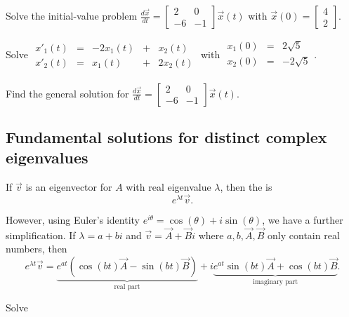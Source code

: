 \documentclass[../main.tex]{subfiles}
\begin{document}
\begin{example}
  Solve the initial-value problem \( \frac{d\vec{x}}{dt} = \begin{bmatrix} 2   & 0  \\ -6 & -1 \end{bmatrix} \vec{x}(t) \) with \(\vec{x}(0) = \begin{bmatrix} 4 \\ 2 \end{bmatrix}\).

\end{example}
\clearpage
\clearpage

\begin{example}
  Solve 
  \(
    \begin{array}{rcrcr}
      x'_{1}(t) &=& -2 x_{1}(t) &+&  x_{2}(t) \\
      x'_{2}(t) &=&    x_{1}(t) &+& 2x_{2}(t)
    \end{array}
  \) with \(
    \begin{array}{rcr}
      x_{1}(0) &=&  2 \sqrt{5} \\
      x_{2}(0) &=& -2 \sqrt{5} \\
    \end{array}
  \).
\end{example}
\clearpage

\begin{example}
  Find the general solution for \( \frac{d\vec{x}}{dt} = \begin{bmatrix} 2   & 0  \\ -6 & -1 \end{bmatrix} \vec{x}(t) \).
\end{example}

\subsection{Fundamental solutions for distinct complex eigenvalues} \label{sec:DE-homogeneous-linear-distinct-complex-eigenvalues}

\begin{definition}
  If \(\vec{v}\) is an eigenvector for \(A\) with real eigenvalue \(\lambda\), then the  is 
  \[
    e^{\lambda t} \vec{v}.
  \]

  However, using Euler's identity \(e^{i \theta} = \cos(\theta) + i \sin(\theta)\), we have a further simplification. If \(\lambda = a + bi\) and \(\vec{v} = \vec{A} + \vec{B}i\) where \(a,b,\vec{A},\vec{B}\) only contain real numbers, then
  \[
    e^{\lambda t} \vec{v} = \underbrace{e^{at}(\cos(bt) \vec{A} - \sin(bt) \vec{B})}_{\text{real part}} + i \underbrace{e^{at} \sin(bt) \vec{A} + \cos(bt) \vec{B}}_{\text{imaginary part}}.
  \]
\end{definition}

\begin{example}
  Solve 
\end{example}
\end{document}
